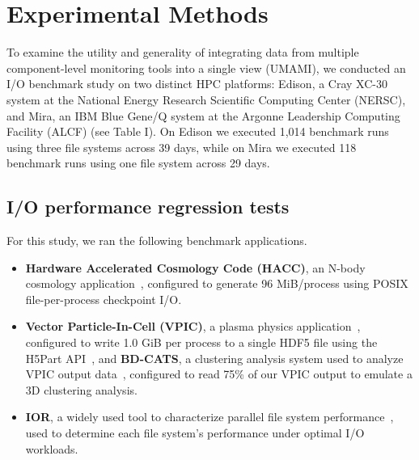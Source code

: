 

\section{Experimental Methods} \label{sec:platforms}

To examine the utility and generality of integrating data from multiple
component-level monitoring tools into a single view (UMAMI), we conducted an
I/O benchmark study on two distinct HPC platforms:
Edison, a Cray XC-30 system at the National Energy Research Scientific
Computing Center (NERSC), and Mira, an IBM Blue Gene/Q system at the Argonne
Leadership Computing Facility (ALCF) (see Table I).  On Edison we executed
1,014 benchmark runs using three file systems across 39 days, while on
Mira we executed 118 benchmark runs using one file system across 29 days.

\subsection{I/O performance regression tests} \label{sec:methods/tests}

\noindent
For this study, we ran the following benchmark applications.

\begin{itemize}[leftmargin=*]
\item 
\textbf{Hardware Accelerated Cosmology Code (HACC)}, an N-body cosmology application~\cite{habib2012}, configured to generate 96 MiB/process using POSIX file-per-process checkpoint I/O.
 \item
\textbf{Vector Particle-In-Cell (VPIC)}, a plasma physics application~\cite{Bowers2008}, configured to write 1.0 GiB per process to a single HDF5 file using the H5Part API~\cite{H5Part}, and 
\textbf{BD-CATS}, a clustering analysis system used to analyze VPIC output data~\cite{Patwary2015}, configured to read 75\% of our VPIC output to emulate a 3D clustering analysis.
\item
\textbf{IOR}, a widely used tool to characterize parallel file system performance~\cite{Yildiz2016,Xie2012,Lofstead2010,Uselton2010}, used to determine each file system's performance under optimal I/O workloads.
 \end{itemize}

